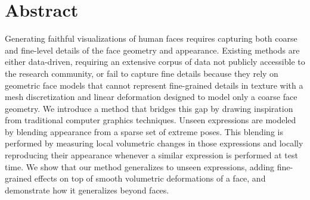 \section{Abstract}
  Generating faithful visualizations of human faces requires capturing both
  coarse and fine-level details of the face geometry and appearance.
  Existing methods are either data-driven, requiring an extensive corpus of
  data not publicly accessible to the research community, or fail to capture
  fine details because they rely on geometric face models that cannot
  represent fine-grained details in texture with a mesh discretization and
  linear deformation designed to model only a coarse face geometry.
  We introduce a method that bridges this gap by drawing inspiration from
  traditional computer graphics techniques.
  Unseen expressions are modeled by blending appearance from a sparse set of
  extreme poses.
  This blending is performed by measuring local volumetric changes in those
  expressions and locally reproducing their appearance whenever a similar
  expression is performed at test time.
  We show that our method generalizes to unseen expressions, adding
  fine-grained effects on top of smooth volumetric deformations of a face, and
  demonstrate how it generalizes beyond faces.
